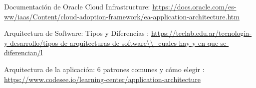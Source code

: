 \documentclass[11pt,letterpaper]{article}
\begin{document}


\begin{thebibliography}{99}


 Documentación de Oracle Cloud Infrastructure: \url{https://docs.oracle.com/es-ww/iaas/Content/cloud-adoption-framework/ea-application-architecture.htm} 

 Arquitectura de Software: Tipos y Diferencias : \url{https://teclab.edu.ar/tecnologia-y-desarrollo/tipos-de-arquitecturas-de-software\\
-cuales-hay-y-en-que-se-diferencian/l}

 Arquitectura de la aplicación: 6 patrones comunes y cómo elegir :  \url{https://www.codesee.io/learning-center/application-architecture}

\end{thebibliography}




\end{document}
